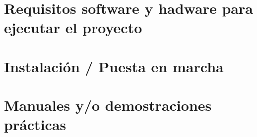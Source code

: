 
\section{Requisitos software y hadware para ejecutar el proyecto}

\section{Instalación / Puesta en marcha}

\section{Manuales y/o demostraciones prácticas}


